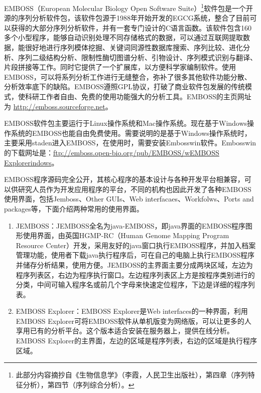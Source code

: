 \documentclass[11pt,a4paper,twoside]{book}
\begin{document}
EMBOSS（European Molecular Biology Open Software Suite）\footnote{此部分内容摘抄自《生物信息学》（李霞，人民卫生出版社），第四章（序列特征分析），第四节（序列综合分析）。}软件包是一个开源的序列分析软件包，该软件包源于1988年开始开发的EGCG系统，整合了目前可以获得的大部分序列分析软件，并有一套专门设计的C语言函数。该软件包含160多个小型程序，能够自动识别处理不同存储格式的数据，可以通过互联网提取数据，能很好地进行序列模体挖掘、关键词同源性数据库搜索、序列比较、进化分析、序列二级结构分析、限制性酶切图谱分析、引物设计、序列模式识别与翻译、片段拼接等工作。同时它提供了一个扩展库，以方便科学家编制软件。使用EMBOSS，可以将系列分析工作进行无缝整合，弥补了很多其他软件功能分散、分析效率底下的缺陷。EMBOSS遵照GPL协议，打破了商业软件包发展的传统模式，使科研工作者自由、免费的使用功能强大的分析工具。EMBOSS的主页网址为 \href{http://emboss.sourceforge.net}{http://emboss.sourceforge.net}。

EMBOSS软件包主要运行于Linux操作系统和Mac操作系统。现在基于Windows操作系统的EMBOSS也能自由免费使用。需要说明的是基于Windows操作系统时，主要采用staden进入EMBOSS，在使用时，需要安装Embosswin软件。Embosswin的下载网址是：\href{ftp://emboss.open-bio.org/pub/EMBOSS/wEMBOSS Explorerindows}{ftp://emboss.open-bio.org/pub/EMBOSS/wEMBOSS Explorerindows}。

EMBOSS程序源码完全公开，其核心程序的基本设计与各种开发平台相兼容，可以供研究人员作为开发应用程序的平台，不同的机构也因此开发了各种EMBOSS使用界面，包括Jemboss、Other GUIs、Web interfacaes、Workfolws、Ports and packages等，下面介绍两种常用的使用界面。

\begin{enumerate}
  \item
    JEMBOSS：JEMBOSS全名为java-EMBOSS，即java界面的EMBOSS程序图形使用界面，由英国HGMP-RC（Human Genome Mapping Program Resource Center）开发，采用友好的java窗口执行EMBOSS程序，并加入档案管理功能，使用者下载java执行程序后，可在自己的电脑上执行EMBOSS程序并储存分析结果，使用方便。JEMBOSS的主界面主要分成两块区域，左边为程序列表区，右边为程序执行窗口。左边程序列表区上方是按程序类别进行的分类，中间可输入程序名或前几个字母来快速定位程序，下边是详细的程序列表。
  \item EMBOSS Explorer：EMBOSS Explorer是Web interfaces的一种界面，利用EMBOSS Explorer可将EMBOSS软件从单机版变为网络版，可以让更多的人享用已有的分析平台。这个版本适合安装在服务器上，提供在线分析。EMBOSS Explorer的主界面，左边的区域是程序列表，右边的区域是执行程序区域。
\end{enumerate}
\end{document}

